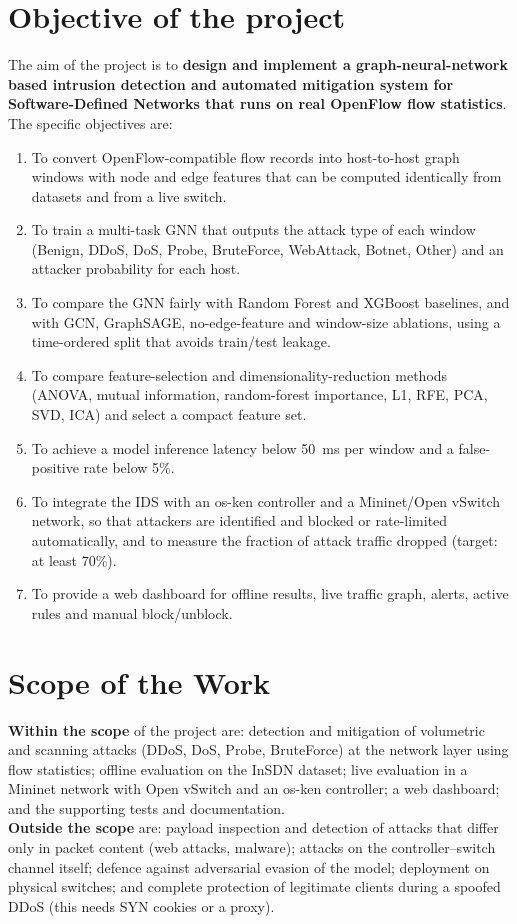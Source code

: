 \section{Objective of the project}

The aim of the project is to \textbf{design and implement a graph-neural-network based intrusion detection and automated mitigation system for Software-Defined Networks that runs on real OpenFlow flow statistics}. The specific objectives are:

\begin{enumerate}
	\item To convert OpenFlow-compatible flow records into host-to-host graph windows with node and edge features that can be computed identically from datasets and from a live switch.
	\item To train a multi-task GNN that outputs the attack type of each window (Benign, DDoS, DoS, Probe, BruteForce, WebAttack, Botnet, Other) and an attacker probability for each host.
	\item To compare the GNN fairly with Random Forest and XGBoost baselines, and with GCN, GraphSAGE, no-edge-feature and window-size ablations, using a time-ordered split that avoids train/test leakage.
	\item To compare feature-selection and dimensionality-reduction methods (ANOVA, mutual information, random-forest importance, L1, RFE, PCA, SVD, ICA) and select a compact feature set.
	\item To achieve a model inference latency below 50~ms per window and a false-positive rate below 5\%.
	\item To integrate the IDS with an os-ken controller and a Mininet/Open vSwitch network, so that attackers are identified and blocked or rate-limited automatically, and to measure the fraction of attack traffic dropped (target: at least 70\%).
	\item To provide a web dashboard for offline results, live traffic graph, alerts, active rules and manual block/unblock.
\end{enumerate}


\section{Scope of the Work}
\textbf{Within the scope} of the project are: detection and mitigation of volumetric and scanning attacks (DDoS, DoS, Probe, BruteForce) at the network layer using flow statistics; offline evaluation on the InSDN dataset; live evaluation in a Mininet network with Open vSwitch and an os-ken controller; a web dashboard; and the supporting tests and documentation.\\
\textbf{Outside the scope} are: payload inspection and detection of attacks that differ only in packet content (web attacks, malware); attacks on the controller--switch channel itself; defence against adversarial evasion of the model; deployment on physical switches; and complete protection of legitimate clients during a spoofed DDoS (this needs SYN cookies or a proxy).

